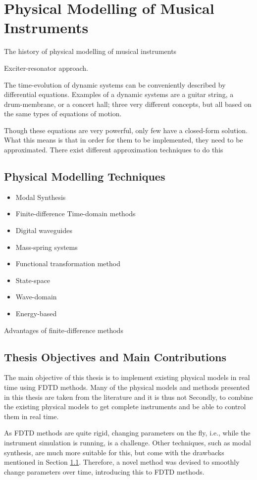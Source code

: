 \chapter{Physical Modelling of Musical Instruments}\label{ch:physMod}

The history of physical modelling of musical instruments

Exciter-resonator approach. 

The time-evolution of dynamic systems can be conveniently described by differential equations. Examples of a dynamic systems are a guitar string, a drum-membrane, or a concert hall; three very different concepts, but all based on the same types of equations of motion.

Though these equations are very powerful, only few have a closed-form solution. What this means is that in order for them to be implemented, they need to be approximated. There exist different approximation techniques to do this  

\section{Physical Modelling Techniques}\label{sec:physModTech}
\begin{itemize}
    \item Modal Synthesis
    \item Finite-difference Time-domain methods
    \item Digital waveguides
    \item Mass-spring systems
    \item Functional transformation method
    \item State-space
    \item Wave-domain
    \item Energy-based
\end{itemize}
    

Advantages of finite-difference methods 
\section{Thesis Objectives and Main Contributions}
The main objective of this thesis is to implement existing physical models in real time using FDTD methods. Many of the physical models and methods presented in this thesis are taken from the literature and it is thus not  Secondly, to combine the existing physical models to get complete instruments and be able to control them in real time.

As FDTD methods are quite rigid, changing parameters on the fly, i.e., while the instrument simulation is running, is a challenge.  Other techniques, such as modal synthesis, are much more suitable for this, but come with the drawbacks mentioned in Section \ref{sec:physModTech}. Therefore, a novel method was devised to smoothly change parameters over time, introducing this to FDTD methods. 

